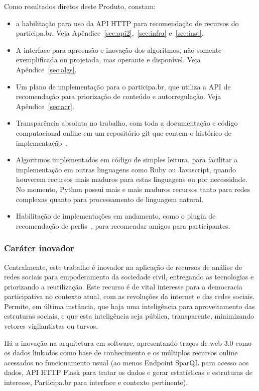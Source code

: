 \documentclass[12pt]{article}
\begin{document}
Como resultados diretos deste Produto, constam:
\begin{itemize}
    \item a habilitação para uso da API HTTP para recomendação de recursos do participa.br. Veja Apêndice~\ref{sec:api2},~\ref{sec:infra} e~\ref{sec:inst}.
    \item A interface para apreensão e inovação dos algoritmos, não somente exemplificada ou projetada, mas operante e disponível. Veja Apêndice~\ref{sec:algs}.
    \item Um plano de implementação para o participa.br, que utiliza a API de recomendação para priorização de conteúdo e autorregulação. Veja Apêndice~\ref{sec:acr}.
    \item Transparência absoluta no trabalho, com toda a documentação e código computacional online em um repositório git que contem o histórico de implementação~\cite{repoProd4}.
    \item Algoritmos implementados em código de simples leitura, para facilitar a implementação em outras linguagens como Ruby ou Javascript, quando houverem recursos mais maduros para estas linguagens ou por necessidade. No momento, Python possui mais e mais maduros recursos tanto para redes complexas quanto para processamento de linguagem natural.
    \item Habilitação de implementações em andamento, como o plugin de recomendação de perfis~\cite{actionItem}, para recomendar amigos para participantes. 
\end{itemize}
\subsubsection{Caráter inovador}
Centralmente, este trabalho é inovador na aplicação de recursos de análise de redes sociais para empoderamento da sociedade civil, entregando as tecnologias e priorizando a reutilização. Este recurso é de vital interesse para a democracia participativa no contexto atual, com as revoluções da internet e das redes sociais. Permite, em última instância, que haja uma inteligência para aproveitamento das estruturas sociais, e que esta inteligência seja pública, transparente, minimizando vetores vigilantistas ou turvos.

Há a inovação na arquitetura em software, apresentando traços de web 3.0 como os dados linkados como base de conhecimento e os múltiplos recursos online acessados no funcionamento usual (ao menos Endpoint SparQL para acesso aos dados, API HTTP Flask para tratar os dados e gerar estatísticas e estruturas de interesse, Participa.br para interface e contexto pertinente).
\end{document}
